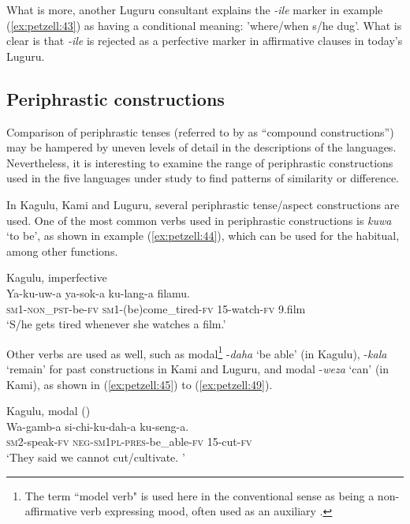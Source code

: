 \documentclass[output=paper,
            colorlinks, citecolor=brown
            ,draftmode
		  ]{langscibook}
\begin{document}
What is more, another Luguru consultant explains the \textit{{}-ile} marker in example (\ref{ex:petzell:43}) as having a conditional meaning: 'where/when s/he dug'. What is clear is that \textit{{}-ile} is rejected as a perfective marker in affirmative clauses in today’s Luguru.


\subsection{Periphrastic constructions}\label{sec:petell:3.8}

Comparison of periphrastic tenses (referred to by \citealt[46]{Nurse2008} as “compound constructions”) may be hampered by uneven levels of detail in the descriptions of the languages. Nevertheless, it is interesting to examine the range of periphrastic constructions used in the five languages under study to find patterns of similarity or difference.



In Kagulu, Kami and Luguru, several periphrastic tense/aspect constructions are used. One of the most common verbs used in periphrastic constructions is \textit{kuwa} `to be', as shown in example (\ref{ex:petzell:44}), which can be used for the habitual, among other functions.


\ea\label{ex:petzell:44}Kagulu, imperfective\\
\gll Ya-ku-uw-a           ya-sok-a                   ku-lang-a    filamu. \\
\textsc{sm1-non\_pst}{}-be-\textsc{fv}  \textsc{sm1}{}-(be)come\_tired-\textsc{fv} \textsc{15}{}-watch\textsc{{}-fv}\textsc{} 9.film\\
\glt `S/he gets tired whenever she watches a film.'
\z


Other verbs are used as well, such as modal\footnote{\label{fn:petzell:4} The term ``model verb" is used here in the conventional sense as being a non-affirmative verb expressing mood, often used as an auxiliary \citep[295]{Crystal2003}.} -\textit{daha} `be able' (in Kagulu), -\textit{kala} `remain' for past constructions in Kami and Luguru, and modal -\textit{weza} `can' (in Kami), as shown in  (\ref{ex:petzell:45}) to (\ref{ex:petzell:49}).


\ea\label{ex:petzell:45}Kagulu, modal (\citealt[187]{Petzell2008})\\
\gll Wa-gamb-a    si-chi-ku-dah-a            ku-seng-a.   \\
\textsc{sm}2\nobreakdash-speak\nobreakdash-\textsc{fv}  \textsc{neg\nobreakdash-sm1pl\nobreakdash-pres}\nobreakdash-be\_able\nobreakdash-\textsc{fv}     15\nobreakdash-cut\nobreakdash-\textsc{fv}\\
\glt `They said we cannot cut/cultivate. '
\end{document}
